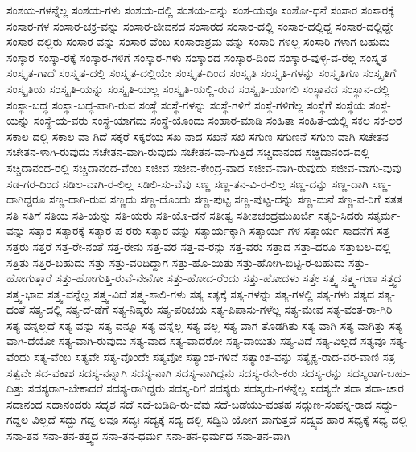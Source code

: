 {ಸಂಶಯ-ಗಳನ್ನೆಲ್ಲ
ಸಂಶಯ-ಗಳು
ಸಂಶಯ-ದಲ್ಲಿ
ಸಂಶಯ-ವನ್ನು
ಸಂಶ-ಯವೂ
ಸಂಶೋ-ಧನೆ
ಸಂಸಾರ
ಸಂಸಾರಕ್ಕೆ
ಸಂಸಾರ-ಗಳ
ಸಂಸಾರ-ಚಕ್ರ-ವನ್ನು
ಸಂಸಾರ-ಜೀವನದ
ಸಂಸಾರದ
ಸಂಸಾರ-ದಲ್ಲಿ
ಸಂಸಾರ-ದಲ್ಲಿದ್ದ
ಸಂಸಾರ-ದಲ್ಲಿದ್ದೇ
ಸಂಸಾರ-ದಲ್ಲಿರು
ಸಂಸಾರ-ವನ್ನು
ಸಂಸಾರ-ವೆಂಬ
ಸಂಸಾರಾಶ್ರಮ-ವನ್ನು
ಸಂಸಾರಿ-ಗಳಲ್ಲ
ಸಂಸಾರಿ-ಗಳಾಗ-ಬಹುದು
ಸಂಸ್ಕಾರ
ಸಂಸ್ಕಾ-ರಕ್ಕೆ
ಸಂಸ್ಕಾರ-ಗಳಿಗೆ
ಸಂಸ್ಕಾರ-ಗಳು
ಸಂಸ್ಕಾರದ
ಸಂಸ್ಕಾರ-ದಿಂದ
ಸಂಸ್ಕಾರ-ವುಳ್ಳ-ವ-ರೆಲ್ಲ
ಸಂಸ್ಕೃತ
ಸಂಸ್ಕೃತ-ಗಾದೆ
ಸಂಸ್ಕೃತ-ದಲ್ಲಿ
ಸಂಸ್ಕೃತ-ದಲ್ಲಿಯೇ
ಸಂಸ್ಕೃತ-ದಿಂದ
ಸಂಸ್ಕೃತಿ
ಸಂಸ್ಕೃತಿ-ಗಳನ್ನು
ಸಂಸ್ಕೃತಿಗೂ
ಸಂಸ್ಕೃತಿಗೆ
ಸಂಸ್ಕೃತಿಯ
ಸಂಸ್ಕೃತಿ-ಯನ್ನು
ಸಂಸ್ಕೃತಿ-ಯಲ್ಲ
ಸಂಸ್ಕೃತಿ-ಯಲ್ಲಿ-ರುವ
ಸಂಸ್ಕೃತಿ-ಯಾಗಲಿ
ಸಂಸ್ಥಾನದ
ಸಂಸ್ಥಾನ-ದಲ್ಲಿ
ಸಂಸ್ಥಾ-ಬದ್ಧ
ಸಂಸ್ಥಾ-ಬದ್ಧ-ವಾಗಿ-ರುವ
ಸಂಸ್ಥೆ
ಸಂಸ್ಥೆ-ಗಳನ್ನು
ಸಂಸ್ಥೆ-ಗಳಿಗೆ
ಸಂಸ್ಥೆ-ಗಳಿಗೆಲ್ಲ
ಸಂಸ್ಥೆಗೆ
ಸಂಸ್ಥೆಯ
ಸಂಸ್ಥೆ-ಯನ್ನು
ಸಂಸ್ಥೆ-ಯ-ವರು
ಸಂಸ್ಥೆ-ಯಾಗದು
ಸಂಸ್ಥೆ-ಯೊಂದು
ಸಂಹಾರ-ಮಾಡಿ
ಸಂಹಿತಾ
ಸಂಹಿತೆ-ಯಲ್ಲಿ
ಸಕಲ
ಸಕ-ಲರ
ಸಕಾಲ-ದಲ್ಲಿ
ಸಕಾಲ-ವಾ-ಗಿದೆ
ಸಕ್ಕರೆ
ಸಕ್ಕರೆಯ
ಸಖ-ನಾದ
ಸಖನೆ
ಸಖಿ
ಸಗುಣ
ಸಗುಣನೆ
ಸಗುಣ-ವಾಗಿ
ಸಚೇತನ
ಸಚೇತನ-ಳಾಗಿ-ರುವುದು
ಸಚೇತನ-ವಾಗಿ-ರುವುದು
ಸಚೇತನ-ವಾ-ಗುತ್ತಿದೆ
ಸಚ್ಚಿದಾನಂದ
ಸಚ್ಚಿದಾನಂದ-ದಲ್ಲಿ
ಸಚ್ಚಿದಾನಂದ-ರಲ್ಲಿ
ಸಚ್ಚಿದಾನಂದ-ವೆಂಬ
ಸಜೀವ
ಸಜೀವ-ಕೇಂದ್ರ-ವಾದ
ಸಜೀವ-ವಾಗಿ-ರುವುದು
ಸಜೀವ-ವಾಗು-ವುವು
ಸಡ-ಗರ-ದಿಂದ
ಸಡಿಲ-ವಾಗಿ-ರ-ಲಿಲ್ಲ
ಸಡಿಲಿ-ಸು-ವೆವು
ಸಣ್ಣ
ಸಣ್ಣ-ತನ-ವಿ-ರ-ಲಿಲ್ಲ
ಸಣ್ಣ-ದನ್ನು
ಸಣ್ಣ-ದಾಗಿ
ಸಣ್ಣ-ದಾಗಿದ್ದರೂ
ಸಣ್ಣ-ದಾಗಿ-ರುವ
ಸಣ್ಣದು
ಸಣ್ಣ-ದೊಂದು
ಸಣ್ಣ-ಪುಟ್ಟ
ಸಣ್ಣ-ಪುಟ್ಟ-ದನ್ನು
ಸಣ್ಣ-ಮನೆ
ಸಣ್ಣ-ವ-ರಿಗೆ
ಸತತ
ಸತಿ
ಸತಿಗೆ
ಸತಿಯ
ಸತಿ-ಯನ್ನು
ಸತಿ-ಯರು
ಸತಿ-ಯೊ-ಡನೆ
ಸತೀತ್ವ
ಸತೀಶಚಂದ್ರಮುಖರ್ಜಿ
ಸತ್ಕರಿ-ಸಿದರು
ಸತ್ಕರ್ಮ-ವನ್ನು
ಸತ್ಕಾರ
ಸತ್ಕಾರಕ್ಕೆ
ಸತ್ಕಾರ-ಪ-ರರು
ಸತ್ಕಾರ-ವನ್ನು
ಸತ್ಕಾರ್ಯಕ್ಕಾಗಿ
ಸತ್ಕಾರ್ಯ-ಗಳ
ಸತ್ಕಾರ್ಯ-ಸಾಧನೆಗೆ
ಸತ್ತ
ಸತ್ತರು
ಸತ್ತರೆ
ಸತ್ತ-ರೇ-ನಂತೆ
ಸತ್ತ-ರೇನು
ಸತ್ತ-ವರ
ಸತ್ತ-ವ-ರನ್ನು
ಸತ್ತ-ವರು
ಸತ್ತಾದ
ಸತ್ತಾ-ದರೂ
ಸತ್ತಾಬಲ-ದಲ್ಲಿ
ಸತ್ತಿತು
ಸತ್ತಿರ-ಬಹುದು
ಸತ್ತು
ಸತ್ತು-ವರಿದಿದ್ದಾಗ
ಸತ್ತು-ಹೊ-ಯಿತು
ಸತ್ತು-ಹೋಗಿ-ಬಿಟ್ಟಿ-ರ-ಬಹುದು
ಸತ್ತು-ಹೋಗುತ್ತಾರೆ
ಸತ್ತು-ಹೋಗುತ್ತಿ-ರುವೆ-ನೇನೋ
ಸತ್ತು-ಹೋದ-ರೆಂದು
ಸತ್ತು-ಹೋದಳು
ಸತ್ತೇ
ಸತ್ತ್ವ
ಸತ್ತ್ವ-ಗುಣ
ಸತ್ತ್ವದ
ಸತ್ತ್ವ-ಭಾವ
ಸತ್ತ್ವ-ವನ್ನೆಲ್ಲ
ಸತ್ತ್ವ-ವಿದೆ
ಸತ್ತ್ವ-ಶಾಲಿ-ಗಳು
ಸತ್ಯ
ಸತ್ಯಕ್ಕೆ
ಸತ್ಯ-ಗಳನ್ನು
ಸತ್ಯ-ಗಳಲ್ಲಿ
ಸತ್ಯ-ಗಳು
ಸತ್ಯದ
ಸತ್ಯ-ದಂತೆ
ಸತ್ಯ-ದಲ್ಲಿ
ಸತ್ಯ-ದೆ-ಡೆಗೆ
ಸತ್ಯ-ನಿಷ್ಠರು
ಸತ್ಯ-ಪರಿಚಯ
ಸತ್ಯ-ಪಿಪಾಸು-ಗಳೆಲ್ಲ
ಸತ್ಯ-ಮೇವ
ಸತ್ಯ-ವಂತ-ರಾ-ಗಿರಿ
ಸತ್ಯ-ವನ್ನಲ್ಲದೆ
ಸತ್ಯ-ವನ್ನು
ಸತ್ಯ-ವನ್ನೂ
ಸತ್ಯ-ವನ್ನೆಲ್ಲ
ಸತ್ಯ-ವಲ್ಲ
ಸತ್ಯ-ವಾಗ-ತೊಡಗಿತು
ಸತ್ಯ-ವಾಗಿ
ಸತ್ಯ-ವಾಗಿತ್ತು
ಸತ್ಯ-ವಾಗಿ-ದೆಯೋ
ಸತ್ಯ-ವಾಗಿ-ರುವುದು
ಸತ್ಯ-ವಾದ
ಸತ್ಯ-ವಾದರೋ
ಸತ್ಯ-ವಾಯಿತು
ಸತ್ಯ-ವಿದೆ
ಸತ್ಯ-ವಿಲ್ಲದೆ
ಸತ್ಯವೂ
ಸತ್ಯ-ವೆಂದು
ಸತ್ಯ-ವೆಂಬ
ಸತ್ಯವೇ
ಸತ್ಯ-ವೊಂದೇ
ಸತ್ಯವೋ
ಸತ್ಯಾಂಶ-ಗಳಿವೆ
ಸತ್ಯಾಂಶ-ವನ್ನು
ಸತ್ಯೈಕ್ಯ-ರಾದ-ವರ-ವಾಣಿ
ಸತ್ರ
ಸತ್ವವೇ
ಸದ-ವಕಾಶ
ಸದಸ್ಯ-ನನ್ನಾಗಿ
ಸದಸ್ಯ-ನಾಗಿ
ಸದಸ್ಯ-ನಾಗಿದ್ದನು
ಸದಸ್ಯ-ರನೇ-ಕರು
ಸದಸ್ಯ-ರನ್ನು
ಸದಸ್ಯರಾಗ-ಬಹು-ದಿತ್ತು
ಸದಸ್ಯರಾಗ-ಬೇಕಾದರೆ
ಸದಸ್ಯ-ರಾಗಿದ್ದರು
ಸದಸ್ಯ-ರಿಗೆ
ಸದಸ್ಯರು
ಸದಸ್ಯರು-ಗಳನ್ನೆಲ್ಲ
ಸದಸ್ಯರೇ
ಸದಾ
ಸದಾ-ಚಾರ
ಸದಾನಂದ
ಸದಾನಂದರು
ಸದೃಶ
ಸದೆ
ಸದೆ-ಬಡಿದಿ-ರು-ವೆವು
ಸದೆ-ಬಡೆಯು-ವಂತಹ
ಸದ್ಗುಣ-ಸಂಪನ್ನ-ರಾದ
ಸದ್ದು-ಗದ್ದಲ-ವಿಲ್ಲದೆ
ಸದ್ದು-ಗದ್ದ-ಲವೂ
ಸದ್ಯಃ
ಸದ್ಯಕ್ಕೆ
ಸದ್ಯ-ದಲ್ಲಿ
ಸದ್ವಿನಿ-ಯೋಗ-ವಾಗುತ್ತದೆ
ಸದ್ವ್ಯವ-ಹಾರ
ಸಧ್ಯಕ್ಕೆ
ಸಧ್ಯ-ದಲ್ಲಿ
ಸನಾ-ತನ
ಸನಾ-ತನ-ತತ್ತ್ವದ
ಸನಾ-ತನ-ಧರ್ಮ
ಸನಾ-ತನ-ಧರ್ಮದ
ಸನಾ-ತನ-ವಾಗಿ
}
